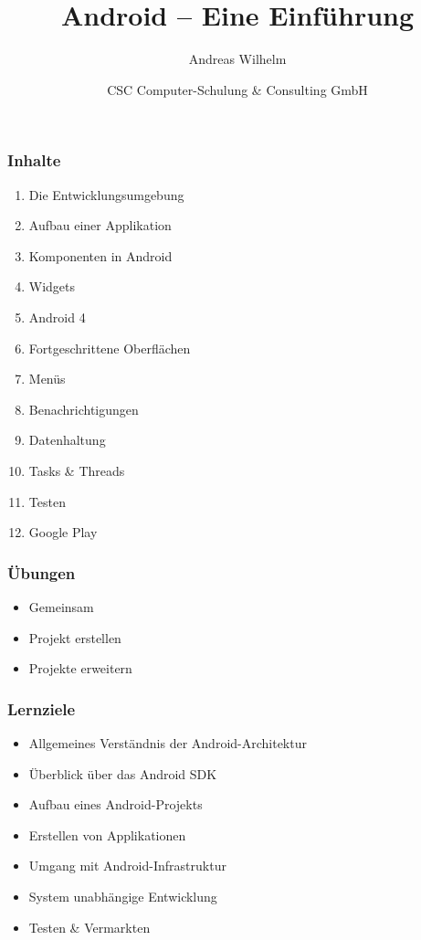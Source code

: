 \title{Android -- Eine Einführung}
\author[A. Wilhelm]{Andreas Wilhelm}
\titlegraphic{}
\date{CSC Computer-Schulung \& Consulting GmbH}

\begin{frame}[plain]
  \titlepage
\end{frame}

\begin{frame}
   \frametitle{Inhalte}
   \begin{enumerate}
		\item Die Entwicklungsumgebung
		\item Aufbau einer Applikation
		\item Komponenten in Android
		\item Widgets
		\item Android 4
		\item Fortgeschrittene Oberflächen
		\item Menüs
		\item Benachrichtigungen
		\item Datenhaltung
		\item Tasks \& Threads
		\item Testen
		\item Google Play
   \end{enumerate}
\end{frame}

\begin{frame}
   \frametitle{Übungen}
   \begin{itemize}
		\item Gemeinsam
		\item Projekt erstellen
		\item Projekte erweitern
   \end{itemize}
\end{frame}

\begin{frame}
   \frametitle{Lernziele}
   \begin{itemize}
		\item Allgemeines Verständnis der Android-Architektur
		\item Überblick über das Android SDK
		\item Aufbau eines Android-Projekts
		\item Erstellen von Applikationen
		\item Umgang mit Android-Infrastruktur
		\item System unabhängige Entwicklung
		\item Testen \& Vermarkten
   \end{itemize}
\end{frame}
